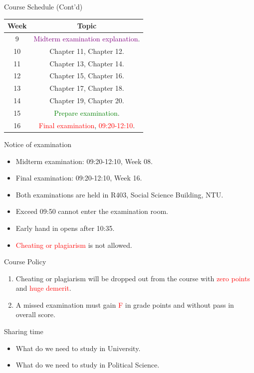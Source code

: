\documentclass{beamer}
\begin{document}
\begin{frame}{Course Schedule (Cont'd)}
\begin{center}
\begin{tabular}{|c|c|}
\hline
Week & Topic \\
\hline
9 & \textcolor{purple}{Midterm examination explanation}.\\
\hline
10 & Chapter 11, Chapter 12.\\
\hline
11 & Chapter 13, Chapter 14.\\
\hline
12 & Chapter 15, Chapter 16.\\
\hline
13 & Chapter 17, Chapter 18.\\
\hline
14 & Chapter 19, Chapter 20.\\
\hline
15 & \textcolor{Green}{Prepare examination}.\\
\hline
16 & \textcolor{red}{Final examination}, \textcolor{red}{09:20-12:10}.\\
\hline
\end{tabular}
\end{center}
\end{frame}
\begin{frame}{Notice of examination}
\begin{itemize}
\item Midterm examination: 09:20-12:10, Week 08.
\item Final examination: 09:20-12:10, Week 16.
\item Both examinations are held in R403, Social Science Building, NTU.
\item Exceed 09:50 cannot enter the examination room.
\item Early hand in opens after 10:35.
\item \textcolor{red}{Cheating or plagiarism} is not allowed.
\end{itemize}
\end{frame}
\begin{frame}{Course Policy}
\begin{enumerate}
\item Cheating or plagiarism will be dropped out from the course with \textcolor{red}{zero points} and \textcolor{red}{huge demerit}. \\
\item A missed examination must gain \textcolor{red}{F} in grade points and without pass in overall score. 
\end{enumerate}
\end{frame}
\begin{frame}{Sharing time}
\begin{itemize}
\item What do we need to study in University.
\item What do we need to study in Political Science.
\end{itemize}
\end{frame}
\end{document}
